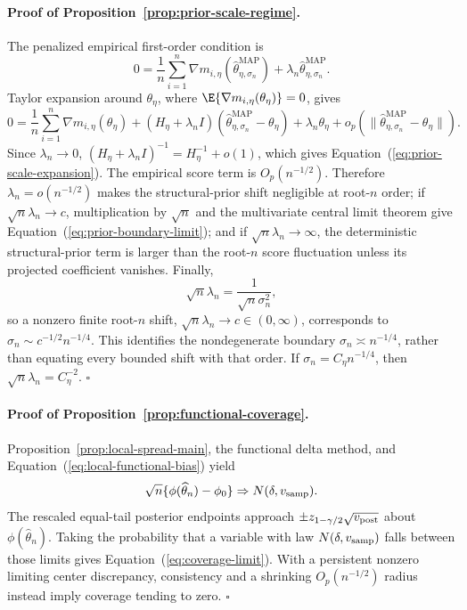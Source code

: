 \documentclass{article} %
\renewcommand{\eqref}[1]{\textup{(\ref{#1})}}
\begin{document}
\paragraph{Proof of Proposition~\ref{prop:prior-scale-regime}.}
The penalized empirical first-order condition is
\[
0
=
\frac1n\sum_{i=1}^n
\nabla m_{i,\eta}(\widehat\theta_{\eta,\sigma_n}^{\mathrm{MAP}})
+\lambda_n\widehat\theta_{\eta,\sigma_n}^{\mathrm{MAP}}.
\]
Taylor expansion around $\theta_\eta$, where
$\E\{\nabla m_{i,\eta}(\theta_\eta)\}=0$, gives
\[
0
=
\frac1n\sum_{i=1}^n\nabla m_{i,\eta}(\theta_\eta)
+(H_\eta+\lambda_n I)
(\widehat\theta_{\eta,\sigma_n}^{\mathrm{MAP}}-\theta_\eta)
+\lambda_n\theta_\eta
+o_p(\|\widehat\theta_{\eta,\sigma_n}^{\mathrm{MAP}}-\theta_\eta\|).
\]
Since $\lambda_n\to0$,
$(H_\eta+\lambda_nI)^{-1}=H_\eta^{-1}+o(1)$, which gives
Equation~\eqref{eq:prior-scale-expansion}. The empirical score term is
$O_p(n^{-1/2})$. Therefore $\lambda_n=o(n^{-1/2})$ makes the structural-prior
shift negligible at root-$n$ order; if $\sqrt n\lambda_n\to c$, multiplication
by $\sqrt n$ and the multivariate central limit theorem give
Equation~\eqref{eq:prior-boundary-limit}; and if $\sqrt n\lambda_n\to\infty$,
the deterministic structural-prior term is larger than the root-$n$ score
fluctuation unless its projected coefficient vanishes. Finally,
\[
\sqrt n\lambda_n
=
\frac{1}{\sqrt n\sigma_n^2},
\]
so a nonzero finite root-$n$ shift, $\sqrt n\lambda_n\to c\in(0,\infty)$, corresponds to
$\sigma_n\sim c^{-1/2}n^{-1/4}$. This identifies the nondegenerate boundary
$\sigma_n\asymp n^{-1/4}$, rather than equating every bounded shift with that order. If $\sigma_n=C_\eta n^{-1/4}$, then
$\sqrt n\lambda_n=C_\eta^{-2}$. \hfill$\square$

\paragraph{Proof of Proposition~\ref{prop:functional-coverage}.}
Proposition~\ref{prop:local-spread-main}, the functional delta method, and Equation~\eqref{eq:local-functional-bias} yield
\[
\sqrt n\{\phi(\widehat\theta_n)-\phi_0\}\Rightarrow N(\delta,v_{\rm samp}).
\]
The rescaled equal-tail posterior endpoints approach
$\pm z_{1-\gamma/2}\sqrt{v_{\rm post}}$ about $\phi(\widehat\theta_n)$. Taking the probability that a variable with law $N(\delta,v_{\rm samp})$ falls between those limits gives Equation~\eqref{eq:coverage-limit}. With a persistent nonzero limiting center discrepancy, consistency and a shrinking $O_p(n^{-1/2})$ radius instead imply coverage tending to zero. \hfill$\square$
\end{document}
